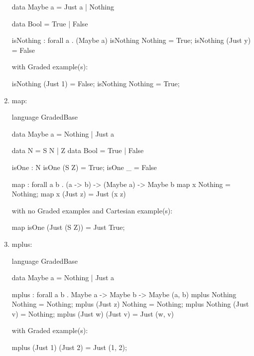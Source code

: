 \begin{enumerate}
\begin{granule}
data Maybe a = Just a | Nothing 
    
data Bool = True | False 
    
isNothing : forall a . (Maybe a) %
isNothing Nothing = True;
isNothing (Just y) = False
\end{granule}
with Graded example(s):
\begin{granule}
isNothing (Just 1) = False;
isNothing Nothing = True;
\end{granule}
\item map: 
\begin{granule}
language GradedBase

data Maybe a = Nothing | Just a

data N = S N | Z
data Bool = True | False

isOne : N %
isOne (S Z) = True;
isOne _ = False

map : forall a b 
    . (a -> b) %
    -> (Maybe a) %
    -> Maybe b
map x Nothing = Nothing;
map x (Just z) = Just (x z)
\end{granule}
with no Graded examples and Cartesian example(s):
\begin{granule}
map isOne (Just (S Z)) = Just True;
\end{granule}
\item mplus: 
\begin{granule}
language GradedBase

data Maybe a = Nothing | Just a

mplus : forall a b 
      . Maybe a %
      -> Maybe b %
      -> Maybe (a, b)
mplus Nothing Nothing = Nothing;
mplus (Just z) Nothing = Nothing;
mplus Nothing (Just v) = Nothing;
mplus (Just w) (Just v) = Just (w, v)
\end{granule}
with Graded example(s):
\begin{granule}
mplus (Just 1) (Just 2) = Just (1, 2);
\end{granule}
\end{enumerate}
